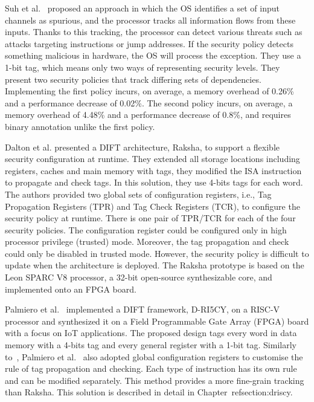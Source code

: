 Suh et al.~\cite{SLD-04-sigplan} proposed an approach in which the OS identifies a set of input channels as spurious, and the processor tracks all information flows from these inputs. Thanks to this tracking, the processor can detect various threats such as attacks targeting instructions or jump addresses. If the security policy detects something malicious in hardware, the OS will process the exception. They use a 1-bit tag, which means only two ways of representing security levels. They present two security policies that track differing sets of dependencies. Implementing the first policy incurs, on average, a memory overhead of 0.26\% and a performance decrease of 0.02\%. The second policy incurs, on average, a memory overhead of 4.48\% and a performance decrease of 0.8\%, and requires binary annotation unlike the first policy.

Dalton et al.\cite{DKK-07-sigarch} presented a DIFT architecture, Raksha, to support a flexible security configuration at runtime. They extended all storage locations including registers, caches and main memory with tags, they modified the ISA instruction to propagate and check tags. In this solution, they use 4-bits tags for each word. %
The authors provided two global sets of configuration registers, i.e., Tag Propagation Registers (TPR) and Tag Check Registers (TCR), to configure the security policy at runtime. There is one pair of TPR/TCR for each of the four security policies. The configuration register could be configured only in high processor privilege (trusted) mode. Moreover, the tag propagation and check could only be disabled in trusted mode. However, the security policy is difficult to update when the architecture is deployed.
The Raksha prototype is based on the Leon SPARC V8 processor, a 32-bit open-source synthesizable core, and implemented onto an FPGA board.

Palmiero et al.~\cite{PDGLC-18-hpec} implemented a DIFT framework, D-RI5CY, on a RISC-V processor and synthesized it on a Field Programmable Gate Array (FPGA) board with a focus on IoT applications. The proposed design tags every word in data memory with a 4-bits tag and every general register with a 1-bit tag. Similarly to~\cite{DKK-07-sigarch}, Palmiero et al.~\cite{PDGLC-18-hpec} also adopted global configuration registers to customise the rule of tag propagation and checking. Each type of instruction has its own rule and can be modified separately. This method provides a more fine-grain tracking than Raksha. This solution is described in detail in Chapter~ref{section:driscy}.

